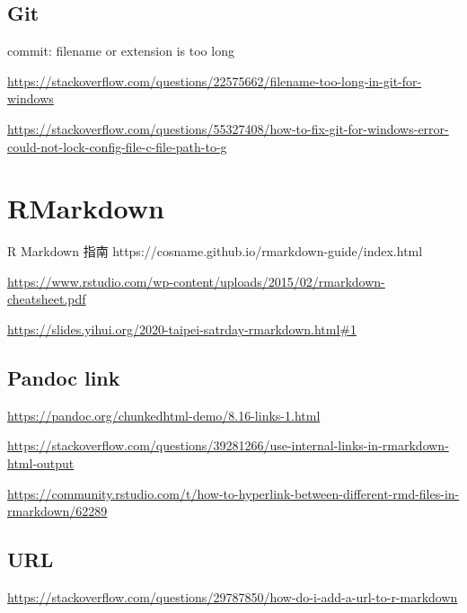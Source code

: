 \documentclass[
]{book}
\theoremstyle{definition}
\theoremstyle{definition}
\theoremstyle{definition}
\theoremstyle{definition}
\theoremstyle{remark}
\begin{document}
\hypertarget{git}{%
\subsection{Git}\label{git}}

commit: filename or extension is too long

\url{https://stackoverflow.com/questions/22575662/filename-too-long-in-git-for-windows}

\url{https://stackoverflow.com/questions/55327408/how-to-fix-git-for-windows-error-could-not-lock-config-file-c-file-path-to-g}

\hypertarget{rmarkdown}{%
\section{RMarkdown}\label{rmarkdown}}

\begin{CJK}{UTF8}{bsmi}
R Markdown 指南 https://cosname.github.io/rmarkdown-guide/index.html
\end{CJK}

\url{https://www.rstudio.com/wp-content/uploads/2015/02/rmarkdown-cheatsheet.pdf}

\url{https://slides.yihui.org/2020-taipei-satrday-rmarkdown.html\#1}

\hypertarget{pandoc-link}{%
\subsection{Pandoc link}\label{pandoc-link}}

\url{https://pandoc.org/chunkedhtml-demo/8.16-links-1.html}

\url{https://stackoverflow.com/questions/39281266/use-internal-links-in-rmarkdown-html-output}

\url{https://community.rstudio.com/t/how-to-hyperlink-between-different-rmd-files-in-rmarkdown/62289}

\hypertarget{url}{%
\subsection{URL}\label{url}}

\url{https://stackoverflow.com/questions/29787850/how-do-i-add-a-url-to-r-markdown}
\end{document}
